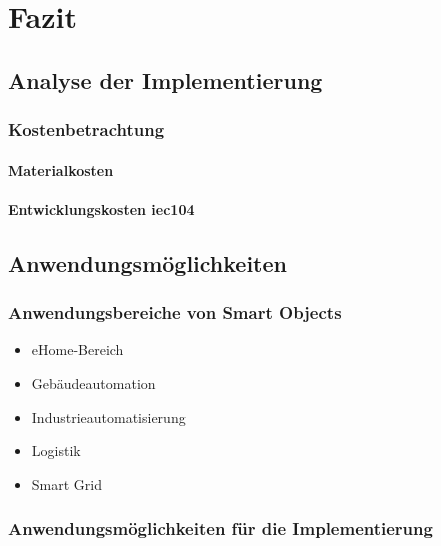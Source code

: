 
\chapter{Fazit} \label{Fazit}



\section{Analyse der Implementierung}



\subsection{Kostenbetrachtung}


\subsubsection{Materialkosten}


\subsubsection{Entwicklungskosten iec104}


\section{Anwendungsmöglichkeiten}



\subsection{Anwendungsbereiche von Smart Objects}



\begin{itemize}
	\itemsep 0pt
	\item eHome-Bereich
	\item Gebäudeautomation
	\item Industrieautomatisierung
	\item Logistik
	\item Smart Grid
\end{itemize}

\subsection{Anwendungsmöglichkeiten für die Implementierung}



